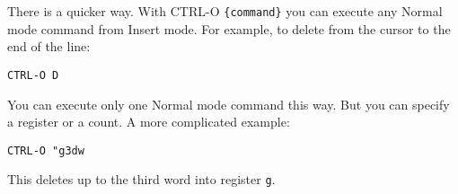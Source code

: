 There is a quicker way.
With CTRL-O \verb!{command}! you can execute any Normal mode command from Insert mode.
For example, to delete from the cursor to the end of the line:

\begin{Verbatim}[samepage=true]
 CTRL-O D
\end{Verbatim}

You can execute only one Normal mode command this way.
But you can specify a register or a count.
A more complicated example:

\begin{Verbatim}[samepage=true]
 CTRL-O "g3dw
\end{Verbatim}

This deletes up to the third word into register \verb!g!.
\clearpage
